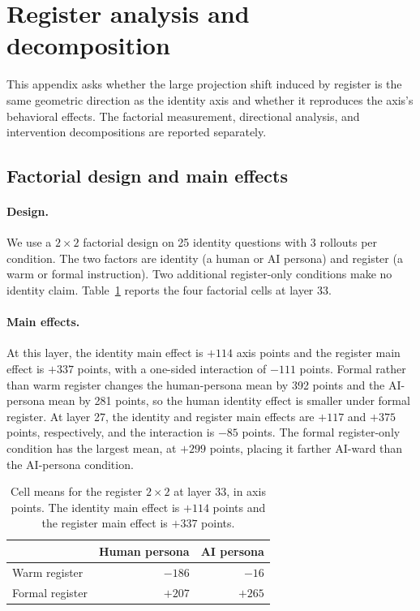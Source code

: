 \section{Register analysis and decomposition}
\label{app:register2x2}

This appendix asks whether the large projection shift induced by register is
the same geometric direction as the identity axis and whether it reproduces the
axis's behavioral effects. The factorial measurement, directional analysis,
and intervention decompositions are reported separately.

\subsection{Factorial design and main effects}
\label{app:register2x2factorial}

\paragraph{Design.}
We use a $2\times2$ factorial design on 25 identity questions with 3 rollouts
per condition. The two factors are identity (a human or AI persona) and register
(a warm or formal instruction). Two additional register-only conditions make no
identity claim. Table~\ref{tab:register2x2} reports the four factorial cells at
layer 33.

\paragraph{Main effects.}
At this layer, the identity main effect is $+114$ axis points and the register
main effect is $+337$ points, with a one-sided interaction of $-111$ points.
Formal rather than warm register changes the human-persona mean by 392 points
and the AI-persona mean by 281 points, so the human identity effect is smaller
under formal register. At layer 27, the identity and register main effects are
$+117$ and $+375$ points, respectively, and the interaction is $-85$ points.
The formal register-only condition has the largest mean, at $+299$ points,
placing it farther AI-ward than the AI-persona condition.

\begin{table}[htbp]
  \caption{Cell means for the register $2\times2$ at layer 33, in axis points.
  The identity main effect is $+114$ points and the register main effect is
  $+337$ points.}
  \label{tab:register2x2}
  \centering
  \begin{tabular}{lrr}
    \toprule
     & Human persona & AI persona \\
    \midrule
    Warm register   & $-186$ & $-16$ \\
    Formal register & $+207$ & $+265$ \\
    \bottomrule
  \end{tabular}
\end{table}

